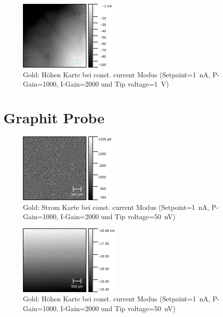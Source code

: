 \documentclass[sn-mathphys-num,iicol]{sn-jnl}
\theoremstyle{thmstyleone}
\theoremstyle{thmstyletwo}
\theoremstyle{thmstylethree}
\begin{document}
\begin{figure}[t]
        \centering
        \includegraphics[width=.5\textwidth]{../data/Gold_400nm_z.png}
        \caption{Gold: Höhen Karte bei const. current Modus (Setpoint=\SI{1}{\nano A}, P-Gain=\SI{1000}{}, I-Gain=\SI{2000}{} und Tip voltage=\SI{1}{V})} \label{fig:g400nmz}
\end{figure}
\section{Graphit Probe}
\begin{figure}[t]
        \centering
        \includegraphics[width=.5\textwidth]{../data/Graphit_4nm_1V_current.png}
        \caption{Gold: Strom Karte bei const. current Modus (Setpoint=\SI{1}{\nano A}, P-Gain=\SI{1000}{}, I-Gain=\SI{2000}{} und Tip voltage=\SI{50}{\nano V})} \label{fig:gr4nm50mVc}
\end{figure}
\begin{figure}[t]
        \centering
        \includegraphics[width=.5\textwidth]{../data/Graphit_4nm_1V_z.png}
        \caption{Gold: Höhen Karte bei const. current Modus (Setpoint=\SI{1}{\nano A}, P-Gain=\SI{1000}{}, I-Gain=\SI{2000}{} und Tip voltage=\SI{50}{\nano V})} \label{fig:gr4nm50mVz}
\end{figure}
\end{document}
